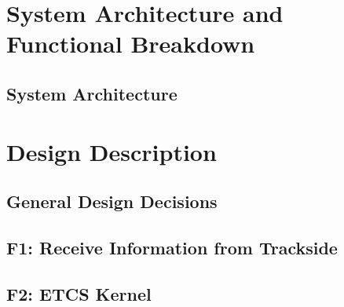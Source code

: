 \documentclass[oneside]{template/openetcs_report}
\begin{document}
\tableofcontents
\listoffigures
\listoftodos
\newpage

\linenumbers




\mainmatter

\setlength{\topsep}{0.5ex}
\setlength{\itemsep}{0ex}
\setlength{\parsep}{0ex}



\part{System Architecture and Functional Breakdown}

%

\chapter{System Architecture}






\part{Design Description}

\chapter{General Design Decisions}




\chapter{F1: Receive Information from Trackside}




\chapter{F2: ETCS Kernel}
\end{document}

